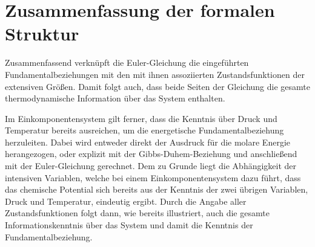 \section{Zusammenfassung der formalen Struktur}
Zusammenfassend verknüpft die Euler-Gleichung die eingeführten Fundamentalbeziehungen mit den mit ihnen assoziierten Zustandsfunktionen der extensiven Größen. Damit folgt auch, dass beide Seiten der Gleichung die gesamte thermodynamische Information über das System enthalten.

Im Einkomponentensystem gilt ferner, dass die Kenntnis über Druck und Temperatur bereits ausreichen, um die energetische Fundamentalbeziehung herzuleiten. Dabei wird entweder direkt der Ausdruck für die molare Energie herangezogen, oder explizit mit der Gibbs-Duhem-Beziehung und anschließend mit der Euler-Gleichung gerechnet. Dem zu Grunde liegt die Abhängigkeit der intensiven Variablen, welche bei einem Einkomponentensystem dazu führt, dass das chemische Potential sich bereits aus der Kenntnis der zwei übrigen Variablen, Druck und Temperatur, eindeutig ergibt. Durch die Angabe aller Zustandsfunktionen folgt dann, wie bereits illustriert, auch die gesamte Informationskenntnis über das System und damit die Kenntnis der Fundamentalbeziehung.
\pagebreak


